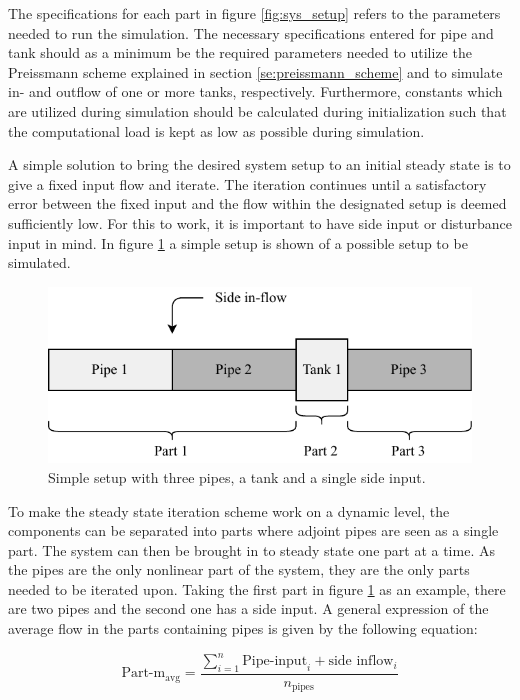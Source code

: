 The specifications for each part in figure \ref{fig:sys_setup} refers to the parameters needed to run the simulation.
The necessary specifications entered for pipe and tank should as a minimum be the required parameters needed to utilize the Preissmann scheme explained in section \ref{se:preissmann_scheme} and to simulate in- and outflow of one or more tanks, respectively. Furthermore, constants which are utilized during simulation should be calculated during initialization such that the computational load is kept as low as possible during simulation. 

A simple solution to bring the desired system setup to an initial steady state is to give a fixed input flow and iterate. 
The iteration continues until a satisfactory error between the fixed input and the flow within the designated setup is deemed sufficiently low. For this to work, it is important to have side input or disturbance input in mind. In figure \ref{fig:simple_sewer} a simple setup is shown of a possible setup to be simulated. 

\begin{figure}[H]
\centering
\includegraphics[width=0.55 \textwidth]{report/simulation/pictures/simple_sewer.pdf}
\caption{Simple setup with three pipes, a tank and a single side input.}
\label{fig:simple_sewer}
\end{figure}

To make the steady state iteration scheme work on a dynamic level, the components can be separated into parts where adjoint pipes are seen as a single part. The system can then be brought in to steady state one part at a time. As the pipes are the only nonlinear part of the system, they are the only parts needed to be iterated upon. Taking the first part in figure \ref{fig:simple_sewer} as an example, there are two pipes and the second one has a side input.
A general expression of the average flow in the parts containing pipes is given by the following equation:

\begin{equation}
 \text{Part-m}_{\text{avg}}	=  \frac{ \sum\limits_{i=1}^n \text{Pipe-input}_i + \text{side inflow}_i }{ n_{\text{pipes}} } 
 \end{equation} \label{avg_init_flow}

